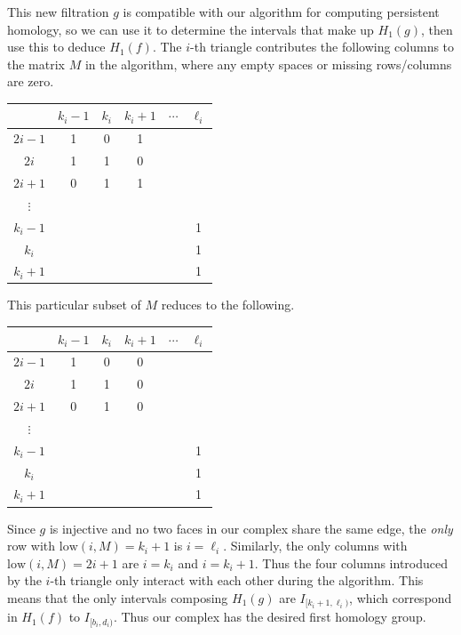 \documentclass[twoside,10pt]{article}
\begin{document}
This new filtration $g$ is compatible with our algorithm for computing persistent homology, so we can use it to determine the intervals that make up $H_1(g)$, then use this to deduce $H_1(f)$. The $i$-th triangle contributes the following columns to the matrix $M$ in the algorithm, where any empty spaces or missing rows/columns are zero.
\begin{center}
	\begin{tabular}{c|c c c c c}
		& $k_i-1$ & $k_i$ & $k_i+1$ & $\cdots$ & $\ell_i$ \\
		\hline
		$2i-1$ & 1 & 0 & 1 \\
		$2i$ & 1 & 1 & 0 \\
		$2i+1$ & 0 & 1 & 1 \\
		$\vdots$ \\
		$k_i-1$ & & & & & 1 \\
		$k_i$ & & & & & 1 \\
		$k_i+1$ & & & & & 1
	\end{tabular}
\end{center}

This particular subset of $M$ reduces to the following.
\begin{center}
        \begin{tabular}{c|c c c c c}
                & $k_i-1$ & $k_i$ & $k_i+1$ & $\cdots$ & $\ell_i$ \\
                \hline
                $2i-1$ & 1 & 0 & {\color{blue}0} \\
                $2i$ & 1 & 1 & {\color{blue}0} \\
                $2i+1$ & 0 & 1 & {\color{blue}0} \\
                $\vdots$ \\
                $k_i-1$ & & & & & 1 \\
                $k_i$ & & & & & 1 \\
                $k_i+1$ & & & & & 1
        \end{tabular}
\end{center}

Since $g$ is injective and no two faces in our complex share the same edge, the \textit{only} row with $\text{low}(i,M) = k_i+1$ is $i=\ell_i$. Similarly, the only columns with $\text{low}(i,M) = 2i+1$ are $i=k_i$ and $i=k_i+1$. Thus the four columns introduced by the $i$-th triangle only interact with each other during the algorithm. This means that the only intervals composing $H_1(g)$ are $I_{[k_i+1,\ell_i)}$, which correspond in $H_1(f)$ to $I_{[b_i,d_i)}$. Thus our complex has the desired first homology group.

\newpage
\end{document}
